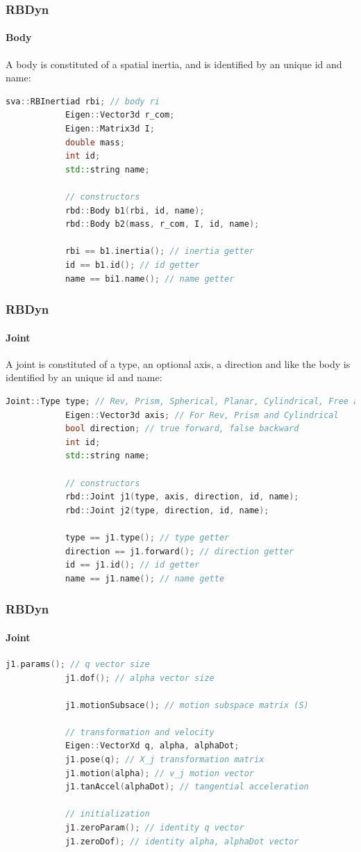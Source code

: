 \documentclass{beamer}
\begin{document}
  	\begin{frame}[fragile]
		\frametitle{RBDyn}
		\framesubtitle{Body}
		A body is constituted of a spatial inertia, and is identified by an unique id and name:
		\begin{lstlisting}[language=C++]
			sva::RBInertiad rbi; // body ri
			Eigen::Vector3d r_com;
			Eigen::Matrix3d I;
			double mass;
			int id;
			std::string name;

			// constructors
			rbd::Body b1(rbi, id, name);
			rbd::Body b2(mass, r_com, I, id, name);

			rbi == b1.inertia(); // inertia getter
			id == b1.id(); // id getter
			name == bi1.name(); // name getter
		\end{lstlisting}
	\end{frame}

  	\begin{frame}[fragile]
		\frametitle{RBDyn}
		\framesubtitle{Joint}
		A joint is constituted of a type, an optional axis, a direction and like the body is identified by an
		unique id and name:
		\begin{lstlisting}[language=C++]
			Joint::Type type; // Rev, Prism, Spherical, Planar, Cylindrical, Free and Fixed
			Eigen::Vector3d axis; // For Rev, Prism and Cylindrical
			bool direction; // true forward, false backward
			int id;
			std::string name;

			// constructors
			rbd::Joint j1(type, axis, direction, id, name);
			rbd::Joint j2(type, direction, id, name);

			type == j1.type(); // type getter
			direction == j1.forward(); // direction getter
			id == j1.id(); // id getter
			name == j1.name(); // name gette
		\end{lstlisting}
	\end{frame}
  	\begin{frame}[fragile]
		\frametitle{RBDyn}
		\framesubtitle{Joint}
		\begin{lstlisting}[language=C++]
			j1.params(); // q vector size
			j1.dof(); // alpha vector size

			j1.motionSubsace(); // motion subspace matrix (S)

			// transformation and velocity
			Eigen::VectorXd q, alpha, alphaDot;
			j1.pose(q); // X_j transformation matrix
			j1.motion(alpha); // v_j motion vector
			j1.tanAccel(alphaDot); // tangential acceleration

			// initialization
			j1.zeroParam(); // identity q vector
			j1.zeroDof); // identity alpha, alphaDot vector
		\end{lstlisting}
	\end{frame}
\end{document}
